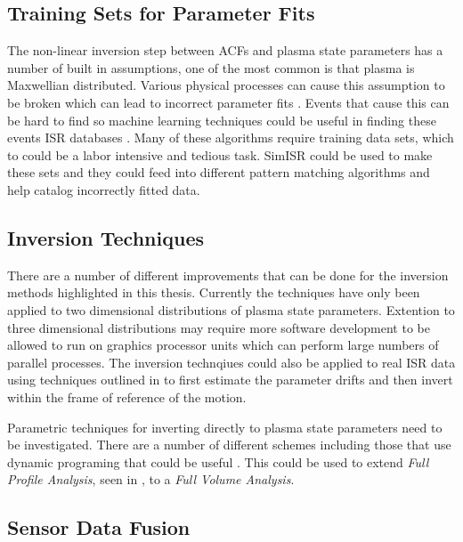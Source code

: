 \subsection{Training Sets for Parameter Fits}

The non-linear inversion step between ACFs and plasma state parameters has a number of built in assumptions, one of the most common is that plasma is Maxwellian distributed. Various physical processes can cause this assumption to be broken which can lead to incorrect parameter fits \cite{St1979ion,Suvanto1988incoherent,Akbari:2015fv}. Events that cause this can be hard to find so machine learning techniques could be useful in finding these events ISR databases \cite{Duda:2000:PC:954544}. Many of these algorithms require training data sets, which to could be a labor intensive and tedious task. SimISR could be used to make these sets and they could feed into different pattern matching algorithms and help catalog incorrectly fitted data.

\subsection{Inversion Techniques}

There are a number of different improvements that can be done for the inversion methods highlighted in this thesis. Currently the techniques have only been applied to two dimensional distributions of plasma state parameters. Extention to three dimensional distributions may require more software development to be allowed to run on graphics processor units which can perform large numbers of parallel processes. The inversion technqiues could also be applied to real ISR data using techniques outlined in \cite{butler:imagingfregiondrifts} to first estimate the parameter drifts and then invert within the frame of reference of the motion.

Parametric techniques for inverting directly to plasma state parameters need to be investigated. There are a number of different schemes including those that use dynamic programing that could be useful \cite{Yau:1992kd,Yau:1993kf,Oktem:2014ju}. This could be used to extend \textit{Full Profile Analysis}, seen in \cite{RDS:RDS3308,hysell2008}, to a \textit{Full Volume Analysis}.

\subsection{Sensor Data Fusion}

